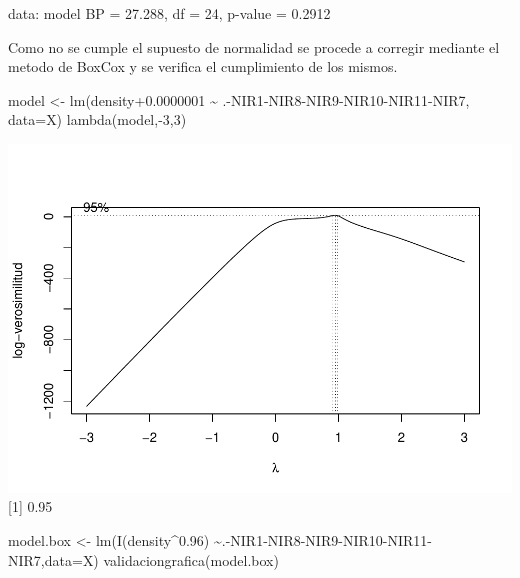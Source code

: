 \documentclass[
]{article}
\newenvironment{Shaded}{\begin{snugshade}}{\end{snugshade}}
\newcommand{\AttributeTok}[1]{\textcolor[rgb]{0.77,0.63,0.00}{#1}}
\newcommand{\DecValTok}[1]{\textcolor[rgb]{0.00,0.00,0.81}{#1}}
\newcommand{\FloatTok}[1]{\textcolor[rgb]{0.00,0.00,0.81}{#1}}
\newcommand{\FunctionTok}[1]{\textcolor[rgb]{0.00,0.00,0.00}{#1}}
\newcommand{\NormalTok}[1]{#1}
\newcommand{\OtherTok}[1]{\textcolor[rgb]{0.56,0.35,0.01}{#1}}
\newcommand{\SpecialCharTok}[1]{\textcolor[rgb]{0.00,0.00,0.00}{#1}}
\begin{document}
data: model BP = 27.288, df = 24, p-value = 0.2912

Como no se cumple el supuesto de normalidad se procede a corregir
mediante el metodo de BoxCox y se verifica el cumplimiento de los
mismos.

\begin{Shaded}
\begin{Highlighting}[]
\NormalTok{model }\OtherTok{\textless{}{-}} \FunctionTok{lm}\NormalTok{(density}\FloatTok{+0.0000001} \SpecialCharTok{\textasciitilde{}}\NormalTok{ .}\SpecialCharTok{{-}}\NormalTok{NIR1}\SpecialCharTok{{-}}\NormalTok{NIR8}\SpecialCharTok{{-}}\NormalTok{NIR9}\SpecialCharTok{{-}}\NormalTok{NIR10}\SpecialCharTok{{-}}\NormalTok{NIR11}\SpecialCharTok{{-}}\NormalTok{NIR7, }\AttributeTok{data=}\NormalTok{X)}
\FunctionTok{lambda}\NormalTok{(model,}\SpecialCharTok{{-}}\DecValTok{3}\NormalTok{,}\DecValTok{3}\NormalTok{)}
\end{Highlighting}
\end{Shaded}

\includegraphics{Taller-2-Regresion-Multiple-Aplicada_files/figure-latex/unnamed-chunk-5-1.pdf}
{[}1{]} 0.95

\begin{Shaded}
\begin{Highlighting}[]
\NormalTok{model.box }\OtherTok{\textless{}{-}} \FunctionTok{lm}\NormalTok{(}\FunctionTok{I}\NormalTok{(density}\SpecialCharTok{\^{}}\FloatTok{0.96}\NormalTok{) }\SpecialCharTok{\textasciitilde{}}\NormalTok{.}\SpecialCharTok{{-}}\NormalTok{NIR1}\SpecialCharTok{{-}}\NormalTok{NIR8}\SpecialCharTok{{-}}\NormalTok{NIR9}\SpecialCharTok{{-}}\NormalTok{NIR10}\SpecialCharTok{{-}}\NormalTok{NIR11}\SpecialCharTok{{-}}\NormalTok{NIR7,}\AttributeTok{data=}\NormalTok{X)}
\FunctionTok{validaciongrafica}\NormalTok{(model.box)}
\end{Highlighting}
\end{Shaded}
\end{document}
